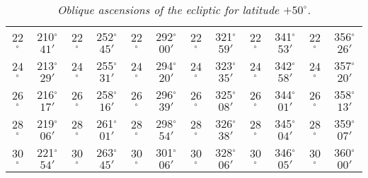 \begin{table}
{\begin{tabular}{cc|cc|cc|cc|cc|cc}
22$^\circ$ & 210$^\circ$$41'$ & 22$^\circ$ & 252$^\circ$$45'$ & 22$^\circ$ & 292$^\circ$$00'$ & 22$^\circ$ & 321$^\circ$$59'$ &  22$^\circ$ & 341$^\circ$$53'$ & 22$^\circ$ & 356$^\circ$$26'$\\
24$^\circ$ & 213$^\circ$$29'$ & 24$^\circ$ & 255$^\circ$$31'$ & 24$^\circ$ & 294$^\circ$$20'$ & 24$^\circ$ & 323$^\circ$$35'$ &  24$^\circ$ & 342$^\circ$$58'$ & 24$^\circ$ & 357$^\circ$$20'$\\
26$^\circ$ & 216$^\circ$$17'$ & 26$^\circ$ & 258$^\circ$$16'$ & 26$^\circ$ & 296$^\circ$$39'$ & 26$^\circ$ & 325$^\circ$$08'$ &  26$^\circ$ & 344$^\circ$$01'$ & 26$^\circ$ & 358$^\circ$$13'$\\
28$^\circ$ & 219$^\circ$$06'$ & 28$^\circ$ & 261$^\circ$$01'$ & 28$^\circ$ & 298$^\circ$$54'$ & 28$^\circ$ & 326$^\circ$$38'$ &  28$^\circ$ & 345$^\circ$$04'$ & 28$^\circ$ & 359$^\circ$$07'$\\
30$^\circ$ & 221$^\circ$$54'$ & 30$^\circ$ & 263$^\circ$$45'$ & 30$^\circ$ & 301$^\circ$$06'$ & 30$^\circ$ & 328$^\circ$$06'$ &  30$^\circ$ & 346$^\circ$$05'$ & 30$^\circ$ & 360$^\circ$$00'$\\
\end{tabular}}
\caption{\em Oblique ascensions of the ecliptic for latitude $+50^\circ$.}\label{txx}
\end{table}

